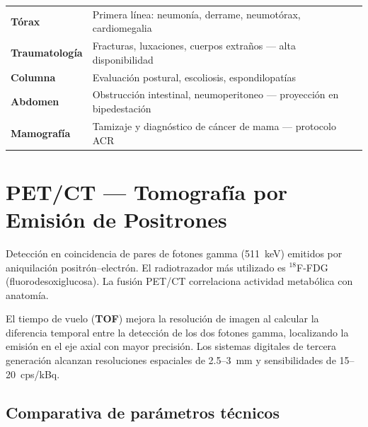 \documentclass[11pt, a4paper]{article}
\begin{document}
\begin{clinicbox}
\begin{tabular}{@{}P{3cm} P{10.5cm}@{}}
\textbf{Tórax}          & Primera línea: neumonía, derrame, neumotórax, cardiomegalia \\[2pt]
\textbf{Traumatología}  & Fracturas, luxaciones, cuerpos extraños --- alta disponibilidad \\[2pt]
\textbf{Columna}        & Evaluación postural, escoliosis, espondilopatías \\[2pt]
\textbf{Abdomen}        & Obstrucción intestinal, neumoperitoneo --- proyección en bipedestación \\[2pt]
\textbf{Mamografía}     & Tamizaje y diagnóstico de cáncer de mama --- protocolo ACR \\
\end{tabular}
\end{clinicbox}

\newpage

\section{PET/CT --- Tomografía por Emisión de Positrones}

\begin{principiobox}
Detección en coincidencia de pares de fotones gamma (511~keV) emitidos por aniquilación
positrón--electrón. El radiotrazador más utilizado es $^{18}$F-FDG (fluorodesoxiglucosa).
La fusión PET/CT correlaciona actividad metabólica con anatomía.
\end{principiobox}

\vspace{6pt}
El tiempo de vuelo (\textbf{TOF}) mejora la resolución de imagen al calcular la diferencia
temporal entre la detección de los dos fotones gamma, localizando la emisión en el eje axial
con mayor precisión. Los sistemas digitales de tercera generación alcanzan resoluciones
espaciales de 2.5--3~mm y sensibilidades de 15--20~cps/kBq.

\subsection{Comparativa de parámetros técnicos}
\end{document}
